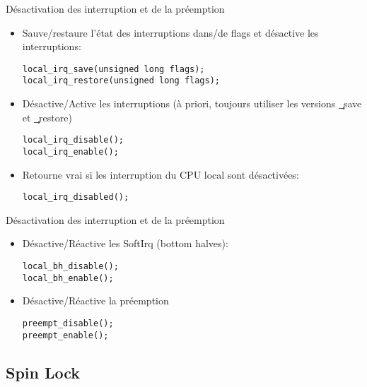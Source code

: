 \begin{frame}[fragile=singleslide]{Désactivation des interruption et de la préemption}
    \begin{itemize}
    \item  Sauve/restaure l'état  des interruptions  dans/de  flags et
      désactive les interruptions:
      \begin{lstlisting}
local_irq_save(unsigned long flags);
local_irq_restore(unsigned long flags);
      \end{lstlisting}
    \item  Désactive/Active  les  interruptions  (à  priori,  toujours
      utiliser les versions \c{_save} et \c{_restore})
      \begin{lstlisting}
local_irq_disable();
local_irq_enable();
      \end{lstlisting}
    \item  Retourne  vrai  si  les  interruption  du  CPU  local  sont
      désactivées:
      \begin{lstlisting}
local_irq_disabled();
      \end{lstlisting}
    \end{itemize}
\end{frame}

\begin{frame}[fragile=singleslide]{Désactivation des interruption et de la préemption}
    \begin{itemize}
    \item Désactive/Réactive les SoftIrq (bottom halves):
      \begin{lstlisting}
local_bh_disable();
local_bh_enable();
      \end{lstlisting}
    \item Désactive/Réactive la préemption
      \begin{lstlisting}
preempt_disable();
preempt_enable();
      \end{lstlisting}
    \end{itemize}
\end{frame}

\subsection{Spin Lock}

